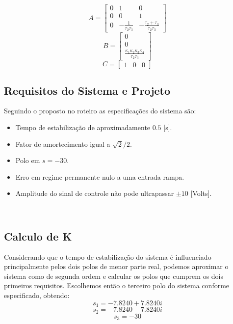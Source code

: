\documentclass{article}
\begin{document}
\begin{equation}
\label{eq:mata}
A=
\begin{bmatrix}
 0 & 1 & 0 \\
 0 & 0 & 1 \\
 0 & -\frac{1}{\tau_2\tau_3} & -\frac{\tau_2+\tau_3}{\tau_2\tau_3}
\end{bmatrix}
\end{equation}
\begin{equation}
\label{eq:matb}
B=
\begin{bmatrix}
0 \\
0 \\
\frac{\kappa_1\kappa_2\kappa_3\kappa_4}{\tau_2\tau_3}
\end{bmatrix}
\end{equation}
\begin{equation}
\label{eq:matc}
C=
\begin{bmatrix}
1 & 0 & 0
\end{bmatrix}
\end{equation}

\subsection{Requisitos do Sistema e Projeto}
Seguindo o proposto no roteiro \cite{bb:roteiro} as especificações do sistema são:
\begin{itemize}
	\item Tempo de estabilização de aproximadamente $0.5$ [s].
	\item Fator de amortecimento igual a $\sqrt{2}/2$.
	\item Polo em $s=-30$.
	\item Erro em regime permanente nulo a uma entrada rampa.
	\item Amplitude do sinal de controle não pode ultrapassar $\pm10$ [Volts].
\end{itemize}\

\subsection{Calculo de K}
Considerando que o tempo de estabilização do sistema é influenciado principalmente pelos dois polos de menor parte real, podemos aproximar o sistema como de segunda ordem e calcular os polos que cumprem os dois primeiros requisitos. Escolhemos então o terceiro polo do sistema conforme especificado, obtendo:
\begin{equation}
	s_1=-7.8240 + 7.8240i
\end{equation}
\begin{equation}
	s_2=-7.8240 - 7.8240i
\end{equation}
\begin{equation}
	s_3=-30
\end{equation}
\end{document}
